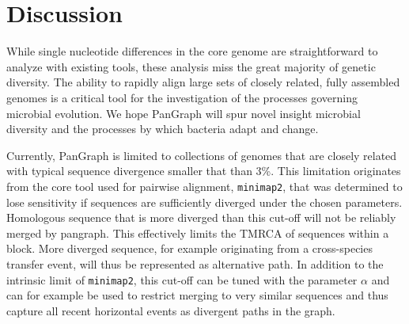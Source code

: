 \documentclass[aps,rmp,reprint,superscriptaddress,notitlepage,10pt]{revtex4-1}
\begin{document}





\section{Discussion}
While single nucleotide differences in the core genome are straightforward to analyze with existing tools, these analysis miss the great majority of genetic diversity.
The ability to rapidly align large sets of closely related, fully assembled genomes is a critical tool for the investigation of the processes governing microbial evolution.
We hope PanGraph will spur novel insight microbial diversity and the processes by which bacteria adapt and change.

Currently, PanGraph is limited to collections of genomes that are closely related with typical sequence divergence smaller that than 3\%.
This limitation originates from the core tool used for pairwise alignment, \texttt{minimap2}, that was determined to lose sensitivity if sequences are sufficiently diverged under the chosen parameters.
Homologous sequence that is more diverged than this cut-off will not be reliably merged by pangraph.
This effectively limits the TMRCA of sequences within a block.
More diverged sequence, for example originating from a cross-species transfer event, will thus be represented as alternative path.
In addition to the intrinsic limit of \texttt{minimap2}, this cut-off can be tuned with the parameter $\alpha$ and can for example be used to restrict merging to very similar sequences and thus capture all recent horizontal events as divergent paths in the graph.
\end{document}
